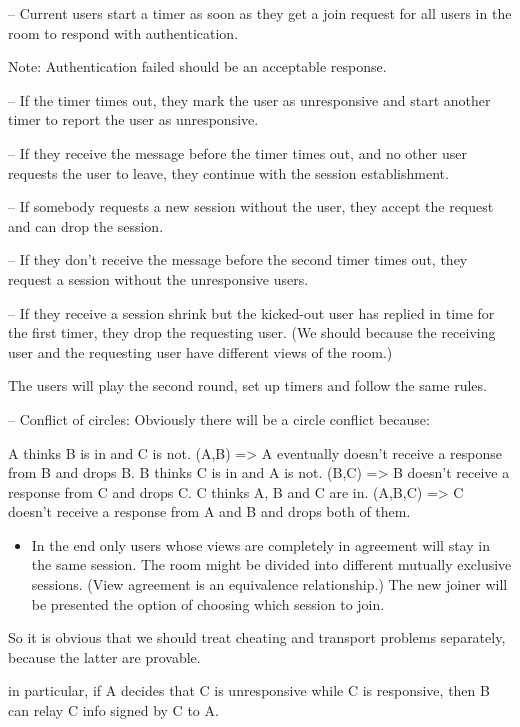 \documentclass[11pt]{article}
\begin{document}
-- Current users start a timer as soon as they get a join request for 
all users in the room to respond with authentication.

Note: Authentication failed should be an acceptable response.

-- If the timer times out, they mark the user as unresponsive and start
another timer to report the user as unresponsive.

-- If they receive the message before the timer times out,
   and no other user requests the user to leave, they continue with
   the session establishment.

-- If somebody requests a new session without the user, they accept
   the request and can drop the session.

-- If they don't receive the message before the second timer times
   out, they request a session without the unresponsive users.

-- If they receive a session shrink but the kicked-out user
   has replied in time for the first timer, they drop the requesting
   user. (We should because the receiving user and the requesting user have different views of the room.)

The users will play the second round, set up timers and follow the same 
rules.

-- Conflict of circles:
   Obviously there will be a circle conflict because:

A thinks B is in and C is not. (A,B) => A eventually doesn't receive a response from B and drops B.
B thinks C is in and A is not. (B,C) =>  B doesn't receive a response from C and drops C.
C thinks A, B and C are in. (A,B,C) => C doesn't receive a response from A and B and drops both of them.

\begin{itemize}
\item In the end only users whose views are completely in agreement will stay in the same session. The room might be
divided into different mutually exclusive sessions. (View agreement is an equivalence relationship.) 
The new joiner will be presented the option of choosing which session to join.
\end{itemize}

So it is obvious that we should treat cheating and transport problems separately, because the latter are provable.

in particular, if A decides that C is unresponsive while C is responsive, then B can relay C info signed by C to A.
\end{document}
